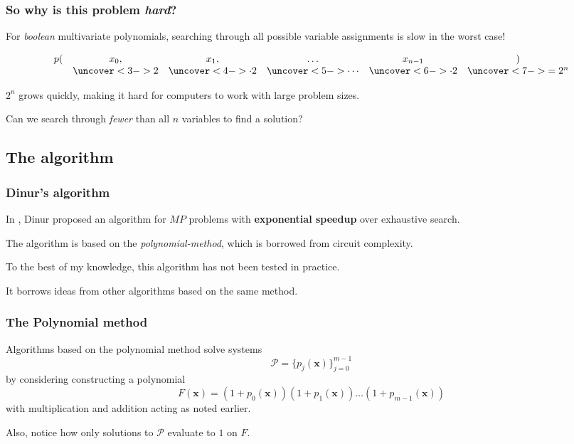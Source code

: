 \documentclass{beamer}
\begin{document}
\begin{frame}
    \frametitle{So why is this problem \textit{hard}?}
    For \textit{boolean} multivariate polynomials, searching through all possible variable assignments is slow in the worst case!

    \pause 

    \begin{equation*}
        \begin{array}{cccccc}
            p(  & x_0,  & x_1,      & \dots    & x_{n - 1}                  & )\\
                & \uncover<3->{2}     & \uncover<4->{\cdot 2}   & \uncover<5->{\cdots}  & \uncover<6->{\cdot 2}  & \uncover<7->{= 2^n}
        \end{array}
    \end{equation*}
    
    \pause[8]

    $2^n$ grows quickly, making it hard for computers to work with large problem sizes.

    \pause[9]

    Can we search through \textit{fewer} than all $n$ variables to find a solution?
\end{frame}

\subsection{The algorithm}
\begin{frame}
    \frametitle{Dinur's algorithm}
    In \cite{eurocrypt-2021-30841}, Dinur proposed an algorithm for $MP$ problems with \textbf{exponential speedup} over exhaustive search.

    The algorithm is based on the \textit{polynomial-method}, which is borrowed from circuit complexity.

    To the best of my knowledge, this algorithm has not been tested in practice.

    It borrows ideas from other algorithms based on the same method.
\end{frame}

\begin{frame}
    \frametitle{The Polynomial method}
    Algorithms based on the polynomial method solve systems 
    $$
        \mathcal{P} = \{p_j(\mathbf{x})\}^{m - 1}_{j = 0}
    $$ 
    by considering constructing a polynomial 
    $$
        F(\mathbf{x}) = (1 + p_0(\mathbf{x}))(1 + p_1(\mathbf{x})) \dots (1 + p_{m - 1}(\mathbf{x}))
    $$
    with multiplication and addition acting as noted earlier.

    Also, notice how only solutions to $\mathcal{P}$ evaluate to $1$ on $F$.
\end{frame}
\end{document}
